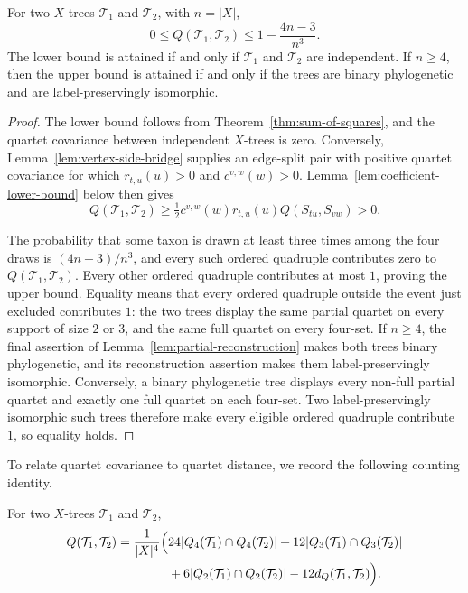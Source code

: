 \documentclass[12pt]{article}
\begin{document}
\begin{corollary}\label{cor:Q-bounds}
For two $X$-trees $\mathcal T_1$ and $\mathcal T_2$, with $n=|X|$,
\begin{equation}\label{eq:quartet-covariance-bounds}
0\le Q(\mathcal T_1,\mathcal T_2)\le1-\frac{4n-3}{n^3}.
\end{equation}
The lower bound is attained if and only if $\mathcal T_1$ and
$\mathcal T_2$ are independent.  If $n\ge4$, then the upper bound is
attained if and only if the trees are binary phylogenetic and are
label-preservingly isomorphic.
\end{corollary}


\begin{proof}
The lower bound follows from Theorem~\ref{thm:sum-of-squares}, and the
quartet covariance between independent $X$-trees is zero.  Conversely,
Lemma~\ref{lem:vertex-side-bridge} supplies an edge-split pair with positive
quartet covariance for
which $r_{t,u}(u)>0$ and $c^{v,w}(w)>0$.
Lemma~\ref{lem:coefficient-lower-bound} below then gives
\begin{equation}\label{eq:display-054}
Q(\mathcal T_1,\mathcal T_2)
\ge\tfrac12c^{v,w}(w)r_{t,u}(u)Q(S_{tu},S_{vw})>0.
\end{equation}

The probability that some taxon is drawn at least three times among the four
draws is $(4n-3)/n^3$, and every such ordered quadruple contributes zero to
$Q(\mathcal T_1,\mathcal T_2)$.  Every other ordered
quadruple contributes at most $1$, proving the upper bound.  Equality means
that every ordered quadruple outside the event just excluded contributes $1$:
the two trees display the same
partial quartet on every support of size $2$ or $3$, and the same full
quartet on every four-set.  If $n\ge4$, the final assertion of
Lemma~\ref{lem:partial-reconstruction} makes both trees binary
phylogenetic, and its reconstruction assertion makes them
label-preservingly isomorphic.  Conversely, a binary phylogenetic tree
displays every non-full partial quartet and exactly one full quartet on each
four-set.  Two label-preservingly isomorphic such trees therefore make every
eligible ordered quadruple contribute $1$, so equality holds.
\end{proof}

To relate quartet covariance to quartet distance, we record the following
counting identity.

\begin{lemma}\label{lem:Q-counts}
For two $X$-trees $\mathcal T_1$ and $\mathcal T_2$,
\begin{equation}\label{eq:display-055}
\begin{aligned}
Q(\mathcal T_1,\mathcal T_2)
=\frac1{|X|^4}\Bigl(&24|Q_4(\mathcal T_1)\cap Q_4(\mathcal T_2)|
+12|Q_3(\mathcal T_1)\cap Q_3(\mathcal T_2)|\\
&+6|Q_2(\mathcal T_1)\cap Q_2(\mathcal T_2)|
-12d_Q(\mathcal T_1,\mathcal T_2)\Bigr).
\end{aligned}
\end{equation}
\end{lemma}
\end{document}
